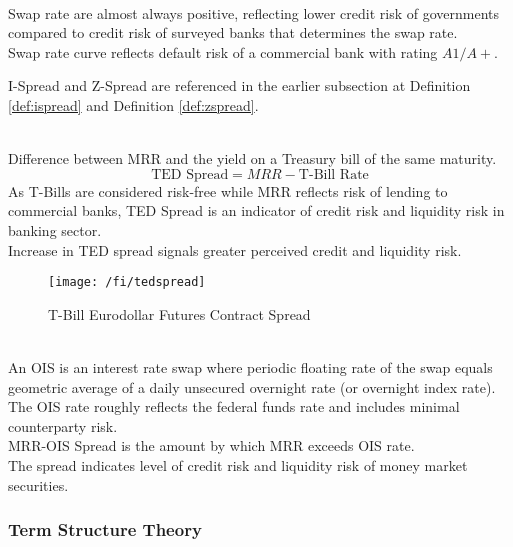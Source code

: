 \begin{remark} \\
Swap rate are almost always positive, reflecting lower credit risk of governments compared to credit risk of surveyed banks that determines the swap rate.\\
Swap rate curve reflects default risk of a commercial bank with rating $A1/A+$.
\end{remark}

I-Spread and Z-Spread are referenced in the earlier subsection at Definition \ref{def:ispread} and Definition \ref{def:zspread}.

\begin{definition} \\
Difference between MRR and the yield on a Treasury bill of the same maturity.
\begin{equation}
\text{TED Spread} = MRR - \text{T-Bill Rate} \nonumber
\end{equation}
As T-Bills are considered risk-free while MRR reflects risk of lending to commercial banks, TED Spread is an indicator of credit risk and liquidity risk in banking sector.\\
Increase in TED spread signals greater perceived credit and liquidity risk.
\end{definition}

\begin{figure}[H]
\centering
\texttt{[image: /fi/tedspread]}
\caption{T-Bill Eurodollar Futures Contract Spread}
\end{figure}

\begin{definition} \\
An OIS is an interest rate swap where periodic floating rate of the swap equals geometric average of a daily unsecured overnight rate (or overnight index rate).\\
The OIS rate roughly reflects the federal funds rate and includes minimal counterparty risk.\\
MRR-OIS Spread is the amount by which MRR exceeds OIS rate.\\
The spread indicates level of credit risk and liquidity risk of money market securities.
\end{definition}

\subsubsection{Term Structure Theory}

